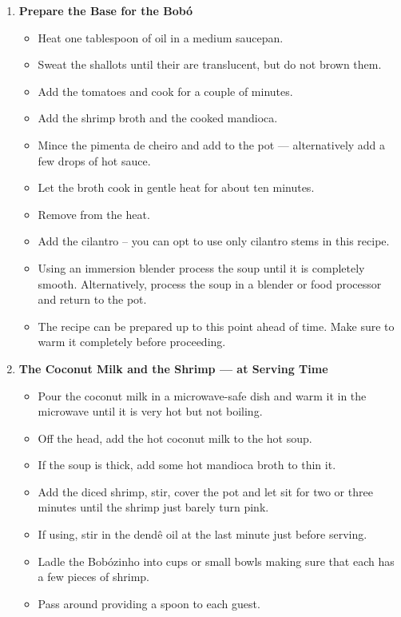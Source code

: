 \documentclass[11pt,letterpaper]{article}
\begin{document}
\begin{description}
\begin{enumerate}
	\item {\bf Prepare the Base for the Bob\'o}
	\begin{itemize}
	\item Heat one tablespoon of oil in a medium saucepan.
	\item Sweat the shallots until their are translucent, but do not brown them.
	\item Add the tomatoes and cook for a couple of minutes.
	\item Add the shrimp broth and the cooked mandioca.
	\item Mince the pimenta de cheiro and add to the pot --- alternatively add a few drops of hot sauce.
	\item Let the broth cook in gentle heat for about ten minutes.
	\item Remove from the heat.
	\item Add the cilantro -- you can opt to use only cilantro stems in this recipe.
	\item Using an immersion blender process the soup until it is completely smooth. Alternatively, process the soup in a blender or food processor and return to the pot.
	\item The recipe can be prepared up to this point ahead of time. Make sure to warm it completely before proceeding.
	\end{itemize}
	\item {\bf The Coconut Milk and the Shrimp --- at Serving Time}
	\begin{itemize}
	\item Pour the coconut milk in a microwave-safe dish and warm it in the microwave until it is very hot but not boiling.
	\item Off the head, add the hot coconut milk to the hot soup.
	\item If the soup is thick, add some hot mandioca broth to thin it.
	\item Add the diced shrimp, stir, cover the pot and let sit for two or three minutes until the shrimp just barely turn pink.
	\item If using, stir in the dend\^e oil at the last minute just before serving.
	\item Ladle the Bob\'ozinho into cups or small bowls making sure that each has a few pieces of shrimp. 
	\item Pass around providing a spoon to each guest.
	\end{itemize}
	\end{enumerate}
\end{description}
\end{document}
